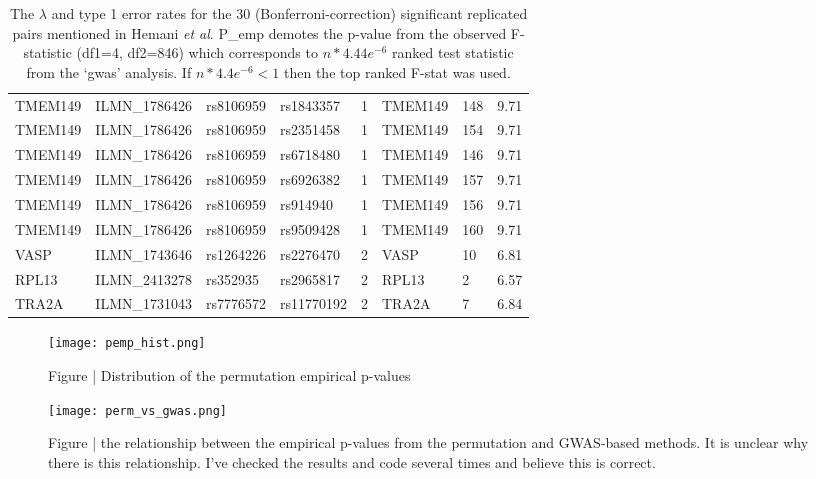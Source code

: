 \documentclass[paper=a4, fontsize=11pt]{scrartcl}         %
\numberwithin{equation}{section}                  %
\numberwithin{figure}{section}                    %
\numberwithin{table}{section}                   %
\begin{document}
\begin{table}[ht]
\begin{tabular}{llllllll}
TMEM149 & ILMN\_1786426 & rs8106959 & rs1843357 & 1 & TMEM149 & 148 & 9.71 \\ 
TMEM149 & ILMN\_1786426 & rs8106959 & rs2351458 & 1 & TMEM149 & 154 & 9.71 \\ 
TMEM149 & ILMN\_1786426 & rs8106959 & rs6718480 & 1 & TMEM149 & 146 & 9.71 \\ 
TMEM149 & ILMN\_1786426 & rs8106959 & rs6926382 & 1 & TMEM149 & 157 & 9.71 \\ 
TMEM149 & ILMN\_1786426 & rs8106959 & rs914940 & 1 & TMEM149 & 156 & 9.71 \\ 
TMEM149 & ILMN\_1786426 & rs8106959 & rs9509428 & 1 & TMEM149 & 160 & 9.71 \\ 
VASP & ILMN\_1743646 & rs1264226 & rs2276470 & 2 & VASP & 10 & 6.81 \\ 
RPL13 & ILMN\_2413278 & rs352935 & rs2965817 & 2 & RPL13 & 2 & 6.57 \\ 
TRA2A & ILMN\_1731043 & rs7776572 & rs11770192 & 2 & TRA2A & 7 & 6.84 \\ 
   \hline
\end{tabular}
\caption*{The $\lambda$ and type 1 error rates for the 30 (Bonferroni-correction) significant replicated pairs mentioned in Hemani \emph{et al}. P\_emp demotes the p-value from the observed F-statistic (df1=4, df2=846) which corresponds to $n*4.44e^{-6}$ ranked test statistic from the ‘gwas’ analysis. If $n*4.4e^{-6} < 1$ then the top ranked F-stat was used.  }
\end{table}


\newpage
\begin{figure}[H]
\centering
\texttt{[image: pemp\_hist.png]}
\caption*{Figure | Distribution of the permutation empirical p-values}
\end{figure}

\begin{figure}[H]
\centering
\texttt{[image: perm\_vs\_gwas.png]}
\caption*{Figure | the relationship between the empirical p-values from the permutation and GWAS-based methods. It is unclear why there is this relationship. I've checked the results and code several times and believe this is correct.}
\end{figure}


\newpage
\end{document}
